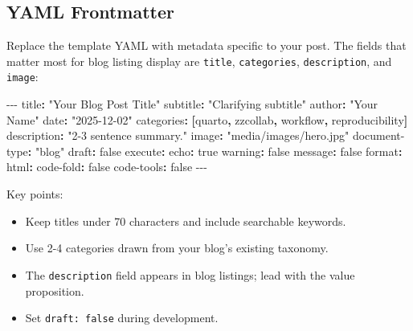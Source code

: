 \documentclass[
  letterpaper,
  DIV=11,
  numbers=noendperiod]{scrartcl}
\newenvironment{Shaded}{\begin{snugshade}}{\end{snugshade}}
\newcommand{\AttributeTok}[1]{\textcolor[rgb]{0.40,0.45,0.13}{#1}}
\newcommand{\CharTok}[1]{\textcolor[rgb]{0.13,0.47,0.30}{#1}}
\newcommand{\FunctionTok}[1]{\textcolor[rgb]{0.28,0.35,0.67}{#1}}
\newcommand{\KeywordTok}[1]{\textcolor[rgb]{0.00,0.23,0.31}{\textbf{#1}}}
\newcommand{\PreprocessorTok}[1]{\textcolor[rgb]{0.68,0.00,0.00}{#1}}
\newcommand{\StringTok}[1]{\textcolor[rgb]{0.13,0.47,0.30}{#1}}
\providecommand{\tightlist}{%
  \setlength{\itemsep}{0pt}\setlength{\parskip}{0pt}}
\begin{document}
\subsection{YAML Frontmatter}\label{yaml-frontmatter}

Replace the template YAML with metadata specific to your post. The
fields that matter most for blog listing display are \texttt{title},
\texttt{categories}, \texttt{description}, and \texttt{image}:

\begin{Shaded}
\begin{Highlighting}[]
\PreprocessorTok{{-}{-}{-}}
\FunctionTok{title}\KeywordTok{:}\AttributeTok{ }\StringTok{"Your Blog Post Title"}
\FunctionTok{subtitle}\KeywordTok{:}\AttributeTok{ }\StringTok{"Clarifying subtitle"}
\FunctionTok{author}\KeywordTok{:}\AttributeTok{ }\StringTok{"Your Name"}
\FunctionTok{date}\KeywordTok{:}\AttributeTok{ }\StringTok{"2025{-}12{-}02"}
\FunctionTok{categories}\KeywordTok{:}\AttributeTok{ }\KeywordTok{[}\AttributeTok{quarto}\KeywordTok{,}\AttributeTok{ zzcollab}\KeywordTok{,}\AttributeTok{ workflow}\KeywordTok{,}\AttributeTok{ reproducibility}\KeywordTok{]}
\FunctionTok{description}\KeywordTok{:}\AttributeTok{ }\StringTok{"2{-}3 sentence summary."}
\FunctionTok{image}\KeywordTok{:}\AttributeTok{ }\StringTok{"media/images/hero.jpg"}
\FunctionTok{document{-}type}\KeywordTok{:}\AttributeTok{ }\StringTok{"blog"}
\FunctionTok{draft}\KeywordTok{:}\AttributeTok{ }\CharTok{false}
\FunctionTok{execute}\KeywordTok{:}
\AttributeTok{  }\FunctionTok{echo}\KeywordTok{:}\AttributeTok{ }\CharTok{true}
\AttributeTok{  }\FunctionTok{warning}\KeywordTok{:}\AttributeTok{ }\CharTok{false}
\AttributeTok{  }\FunctionTok{message}\KeywordTok{:}\AttributeTok{ }\CharTok{false}
\FunctionTok{format}\KeywordTok{:}
\AttributeTok{  }\FunctionTok{html}\KeywordTok{:}
\AttributeTok{    }\FunctionTok{code{-}fold}\KeywordTok{:}\AttributeTok{ }\CharTok{false}
\AttributeTok{    }\FunctionTok{code{-}tools}\KeywordTok{:}\AttributeTok{ }\CharTok{false}
\PreprocessorTok{{-}{-}{-}}
\end{Highlighting}
\end{Shaded}

Key points:

\begin{itemize}
\tightlist
\item
  Keep titles under 70 characters and include searchable keywords.
\item
  Use 2-4 categories drawn from your blog's existing taxonomy.
\item
  The \texttt{description} field appears in blog listings; lead with the
  value proposition.
\item
  Set \texttt{draft:\ false} during development.
\end{itemize}
\end{document}
